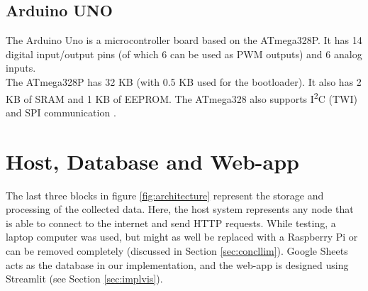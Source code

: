 \documentclass[./main.tex]{subfiles}
\begin{document}
\subsection{Arduino UNO}
The Arduino Uno is a microcontroller board based on the ATmega328P. It has 14
digital input/output pins (of which 6 can be used as PWM outputs) and 6 analog
inputs. \\ The ATmega328P has 32 KB (with 0.5 KB used for the bootloader). It
also has 2 KB of SRAM and 1 KB of EEPROM. The ATmega328 also supports
I\textsuperscript{2}C (TWI) and SPI communication \cite{arddata}.

\section{Host, Database and Web-app}\label{sec:archhostdb}
The last three blocks in figure \ref{fig:architecture} represent the storage
and processing of the collected data. Here, the host system represents any node
that is able to connect to the internet and send HTTP requests. While testing,
a laptop computer was used, but might as well be replaced with a Raspberry Pi
or can be removed completely (discussed in Section \ref{sec:concllim}). Google
Sheets acts as the database in our implementation, and the web-app is designed
using Streamlit (see Section \ref{sec:implvis}).
\end{document}
